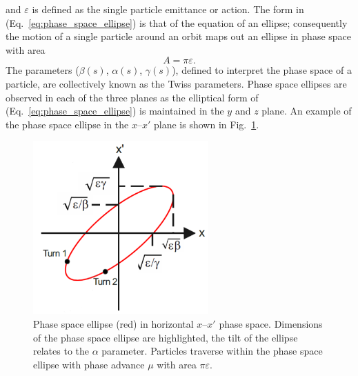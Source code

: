 \documentclass[../main.tex]{subfiles}
\begin{document}
and $\varepsilon$ is defined as the single particle emittance or action. The form in (Eq.~\ref{eq:phase_space_ellipse}) is that of the equation of an ellipse; consequently the motion of a single particle around an orbit maps out an ellipse in phase space with area
\begin{equation}
A=\pi\varepsilon.
\label{eq:phase_space_area}    
\end{equation}
The parameters ($\beta\left(s\right)$, $\alpha\left(s\right)$, $\gamma\left(s\right)$), defined to interpret the phase space of a particle, are collectively known as the Twiss parameters. Phase space ellipses are observed in each of the three planes as the elliptical form of (Eq.~\ref{eq:phase_space_ellipse}) is maintained in the $y$ and $z$ plane. An example of the phase space ellipse in the $x$--$x'$ plane is shown in Fig.~\ref{fig:phase_space_diagram}.
\begin{figure}[!h]
\centering
\includegraphics[width=0.6\textwidth]{Figures/Energy_Recovery_Linac_Design/phase_space_fixed.pdf}
\caption{Phase space ellipse (red) in horizontal $x$--$x'$ phase space. Dimensions of the phase space ellipse are highlighted, the tilt of the ellipse relates to the $\alpha$ parameter. Particles traverse within the phase space ellipse with phase advance $\mu$ with area $\pi\varepsilon$.}
\label{fig:phase_space_diagram}
\end{figure}
\end{document}
